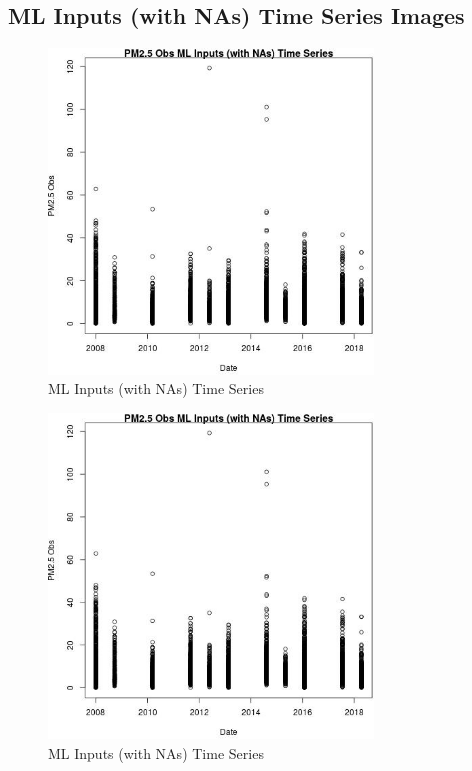 
\subsection{ML Inputs (with NAs) Time Series Images} 
 

\begin{figure} 
\centering  
\includegraphics[width=0.77\textwidth]{Code_Outputs/Report_ML_input_PM25_Step4_part_e_de_duplicated_aves_compiled_2019-05-18wNAs_PM25_ObsvDate.jpg} 
\caption{\label{fig:Report_ML_input_PM25_Step4_part_e_de_duplicated_aves_compiled_2019-05-18wNAsPM25_ObsvDate}ML Inputs (with NAs) Time Series} 
\end{figure} 
 

\begin{figure} 
\centering  
\includegraphics[width=0.77\textwidth]{Code_Outputs/Report_ML_input_PM25_Step4_part_e_de_duplicated_aves_compiled_2019-05-18wNAs_PM25_ObsvDate.jpg} 
\caption{\label{fig:Report_ML_input_PM25_Step4_part_e_de_duplicated_aves_compiled_2019-05-18wNAsPM25_ObsvDate}ML Inputs (with NAs) Time Series} 
\end{figure} 
 

